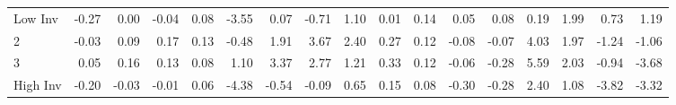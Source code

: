 \begin{table}[!ht]
\begin{tabular}{lrrrrrrrrrrrrrrrr}
    Low Inv   & -0.27  & 0.00  & -0.04  & 0.08  & -3.55  & 0.07  & -0.71  & 1.10  & 0.01  & 0.14  & 0.05  & 0.08  & 0.19  & 1.99  & 0.73  & 1.19  \\
           2  & -0.03  & 0.09  & 0.17  & 0.13  & -0.48  & 1.91  & 3.67  & 2.40  & 0.27  & 0.12  & -0.08  & -0.07  & 4.03  & 1.97  & -1.24  & -1.06  \\
           3  & 0.05  & 0.16  & 0.13  & 0.08  & 1.10  & 3.37  & 2.77  & 1.21  & 0.33  & 0.12  & -0.06  & -0.28  & 5.59  & 2.03  & -0.94  & -3.68  \\
    High Inv  & -0.20  & -0.03  & -0.01  & 0.06  & -4.38  & -0.54  & -0.09  & 0.65  & 0.15  & 0.08  & -0.30  & -0.28  & 2.40  & 1.08  & -3.82  & -3.32  \\

  

  \bottomrule
\end{tabular}
\label{tbl:32_Size_BM_Inv_B16}
\end{table}